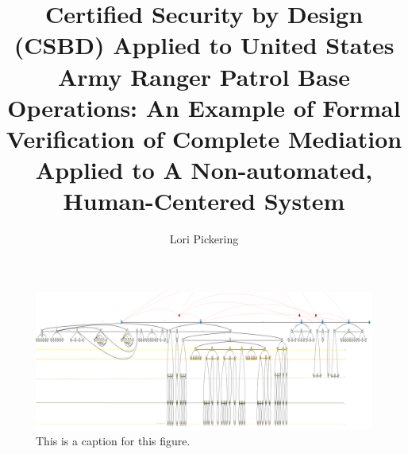 \documentclass[hidelinks,12pt,a4paper]{report}
\begin{document}
\lstset{language=ML, basicstyle=\scriptsize}
\title{Certified Security by Design (CSBD) Applied to United States Army Ranger Patrol Base Operations: An Example of Formal Verification of Complete Mediation Applied to A Non-automated, Human-Centered System}
\author{Lori Pickering}



\begin{figure}[t]
\includegraphics[width=\textwidth]{../figures/overalldiagramsquashed.png}
\caption{This is a caption for this figure.}
\end{figure}

\begin{doublespace}
\cleardoublepage {}
{}

\setcounter{page}{1}
\end{doublespace}
\cleardoublepage {}

\tableofcontents
\cleardoublepage



\hypersetup{
  colorlinks   = true, %
  urlcolor     = blue, %
  linkcolor    = blue, %
  citecolor   = red %
}

\cleardoublepage {}
\listoffigures

\cleardoublepage {}
\listoftables

\cleardoublepage
%
\printnoidxglossary[type=\acronymtype, title={List of Acronyms}]
\cleardoublepage

\parskip=18pt
\raggedright
\end{document}

